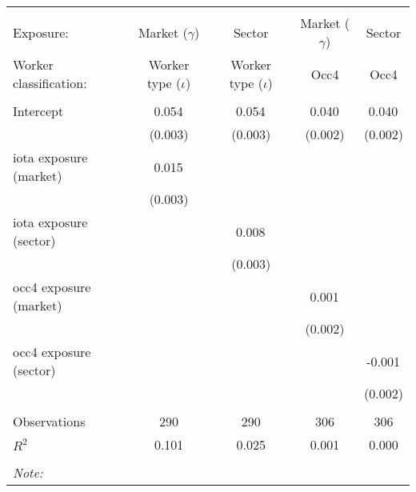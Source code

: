 \begin{tabular}{@{\extracolsep{5pt}}lcccc}
\\[-1.8ex]\hline
\hline \\[-1.8ex]
\hline \\[-1.8ex]
 Exposure: & Market ($\gamma$) & Sector & Market ($\gamma$) & Sector \\
 Worker classification: & Worker type ($\iota$) & Worker type ($\iota$) & Occ4 & Occ4 \\
 \hline &  &  &  &  \\
 Intercept & 0.054$^{}$ & 0.054$^{}$ & 0.040$^{}$ & 0.040$^{}$ \\
  & (0.003) & (0.003) & (0.002) & (0.002) \\
 iota exposure (market) & 0.015$^{}$ & & & \\
  & (0.003) & & & \\
 iota exposure (sector) & & 0.008$^{}$ & & \\
  & & (0.003) & & \\
 occ4 exposure (market) & & & 0.001$^{}$ & \\
  & & & (0.002) & \\
 occ4 exposure (sector) & & & & -0.001$^{}$ \\
  & & & & (0.002) \\
\hline \\[-1.8ex]
 Observations & 290 & 290 & 306 & 306 \\
 $R^2$ & 0.101 & 0.025 & 0.001 & 0.000 \\
\hline
\hline \\[-1.8ex]
\textit{Note:}\end{tabular}